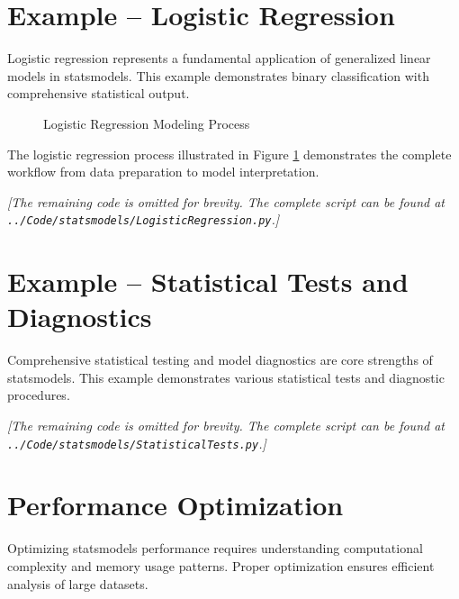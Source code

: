 \section{Example -- Logistic Regression}
\label{sec:logistic_example}

Logistic regression represents a fundamental application of generalized linear models in statsmodels. This example demonstrates binary classification with comprehensive statistical output.

\begin{figure}[htbp]
	\centering
    
	\caption{Logistic Regression Modeling Process}
	\label{fig:logistic_regression}
\end{figure}

The logistic regression process illustrated in Figure \ref{fig:logistic_regression} demonstrates the complete workflow from data preparation to model interpretation.



\noindent\textit{[The remaining code is omitted for brevity. The complete script can be found at \texttt{../Code/statsmodels/LogisticRegression.py}.]}

\section{Example -- Statistical Tests and Diagnostics}
\label{sec:diagnostics_example}

Comprehensive statistical testing and model diagnostics are core strengths of statsmodels. This example demonstrates various statistical tests and diagnostic procedures.



\noindent\textit{[The remaining code is omitted for brevity. The complete script can be found at \texttt{../Code/statsmodels/StatisticalTests.py}.]}

\section{Performance Optimization}
\label{sec:optimization}

Optimizing statsmodels performance requires understanding computational complexity and memory usage patterns. Proper optimization ensures efficient analysis of large datasets.

